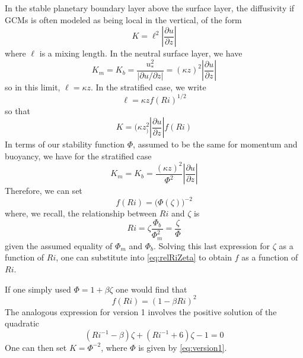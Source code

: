 \documentclass[12pt, letterpaper]{article}
\begin{document}
In the stable planetary boundary layer above the surface layer, the
diffusivity if GCMs is often modeled as being local in the vertical,
of the form
\begin{equation}
  K = \ell^2\left|\frac{\partial u}{\partial z}\right|
\end{equation}
where $\ell$ is a mixing length.  In the neutral surface layer, we have
\begin{equation}
  K_m = K_b = \frac{u_*^2}{|\partial u/\partial z|} = (\kappa z)^2\left|\frac{\partial u}{\partial z}\right|
\end{equation}
so in this limit, $\ell = \kappa z$.  In the stratified case, we write
\begin{equation}
  \ell = \kappa z f(Ri)^{1/2}
\end{equation}
so that
\begin{equation}
  K = (\kappa z_)^2 \left|\frac{\partial u}{\partial z}\right|f(Ri) \label{eq:stratifiedcase}
\end{equation}
In terms of our stability function $\Phi$, assumed to be the same for
momentum and buoyancy, we have for the stratified case
\begin{equation}
  K_m = K_b = \frac{(\kappa z)^2}{\Phi^2}\left|\frac{\partial u}{\partial z}\right|
\end{equation}
Therefore, we can set
\begin{equation}
  f(Ri) = \big(\Phi(\zeta)\big)^{-2} \label{eq:relRiZeta}
\end{equation}
where, we recall, the relationship between $Ri$ and $\zeta$ is
\begin{equation}
  Ri = \zeta\frac{\Phi_b}{\Phi_m^2} = \frac{\zeta}{\Phi}
\end{equation}
given the assumed equality of $\Phi_m$ and $\Phi_b$.  Solving this
last expression for $\zeta$ as a function of $Ri$, one can substitute
into \eqref{eq:relRiZeta} to obtain $f$ as a function of $Ri$.

If one simply used $\Phi = 1 + \beta\zeta$ one would find that
\begin{equation}
  f(Ri) = (1-\beta Ri)^2
\end{equation}
The analogous expression for version 1 involves the positive solution
of the quadratic
\begin{equation}
  (Ri^{-1}-\beta)\zeta+(Ri^{-1}+6)\zeta-1 = 0
\end{equation}
One can then set $K=\Phi^{-2}$, where $\Phi$ is given by
\eqref{eq:version1}.
\end{document}
